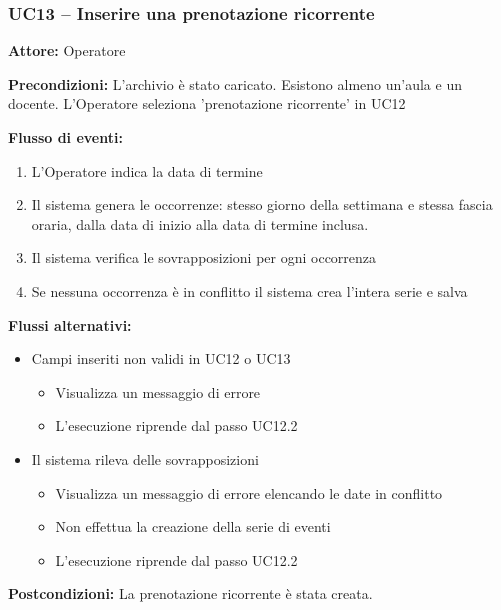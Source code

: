 \documentclass[a4paper,11pt]{article}
\begin{document}
\begin{samepage}
\subsubsection*{UC13 -- Inserire una prenotazione ricorrente}
\begin{ucbox}

\noindent\textbf{Attore:} Operatore\par
\noindent\textbf{Precondizioni:} L'archivio è stato caricato. Esistono almeno un'aula e un docente. L'Operatore seleziona 'prenotazione ricorrente' in UC12\par

\noindent\textbf{Flusso di eventi:}
\begin{enumerate}
\item L'Operatore indica la data di termine \item Il sistema genera le occorrenze: stesso giorno della settimana e stessa fascia oraria, dalla data di inizio alla data di termine inclusa. \item Il sistema verifica le sovrapposizioni per ogni occorrenza \item Se nessuna occorrenza è in conflitto il sistema crea l'intera serie e salva \end{enumerate}
\noindent\textbf{Flussi alternativi:}
\begin{itemize}
\item[1a.] Campi inseriti non validi in UC12 o UC13
\begin{itemize}
\item Visualizza un messaggio di errore
\item L'esecuzione riprende dal passo UC12.2
\end{itemize}
\item[3a.] Il sistema rileva delle sovrapposizioni
\begin{itemize}
\item Visualizza un messaggio di errore elencando le date in conflitto
\item Non effettua la creazione della serie di eventi
\item L'esecuzione riprende dal passo UC12.2
\end{itemize}
\end{itemize}
\noindent\textbf{Postcondizioni:} La prenotazione ricorrente è stata creata.\par
\end{ucbox}
\end{samepage}
\end{document}
